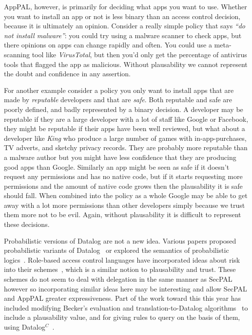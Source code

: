 \documentclass[thesis.tex]{subfiles}
\begin{document}
AppPAL, however, is primarily for deciding what apps you want to use.
Whether you want to install an app or not is less binary than an
access control decision, because it is ultimately an opinion.
Consider a really simple policy that says \emph{``do not install
malware''}: you could try using a malware scanner to check apps, but
there opinions on apps can change rapidly and often.  You could use a
meta-scanning tool like \emph{VirusTotal}, but then you'd only get the
percentage of antivirus tools that flagged the app as malicious.
Without plausability we cannot represent the doubt and confidence in
any assertion.

For another example consider a policy you only want to install apps
that are made by \emph{reputable} developers and that are \emph{safe}.
Both reputable and safe are poorly defined, and badly represented by a
binary decision.  A developer may be reputable if they are a large
developer with a lot of staff like Google or Facebook, they might be
reputable if their apps have been well reviewed, but what about a
developer like \emph{King} who produce a large number of games with
in-app-purchases, TV adverts, and sketchy privacy records.  They are
probably more reputable than a malware author but you might have less
confidence that they are producing good apps than Google.  Similarly
an app might be seen as safe if it doesn't request any permissions and
has no native code, but if it starts requesting more permissions and
the amount of native code grows then the plausability it is safe
should fall.  When combined into the policy as a whole Google may be
able to get away with a lot more permissions than other developers
simply because we trust them more not to be evil.  Again, without
plausability it is difficult to represent these decisions.

Probabilistic versions of Datalog are not a new idea.  Various papers proposed
probabilistic variants of Datalog~\cite{fuhr_probabilistic_1995} or explored the
semantics of probabilistic logics~\cite{halpern_analysis_1990}.  Role-based
access control languages have incorporated ideas about risk into their
schemes~\cite{josang_analysing_2004,dimmock_using_2004,salim_approach_2011},
which is a similar notion to plausability and trust.  These schemes do not seem
to deal with delegation in the same manner as SecPAL however so incorporating
similar ideas here may be interesting and allow SecPAL and AppPAL greater
expressiveness.  Part of the work toward this this year has included modifying Becker's
evaluation and translation-to-Datalog algorithms~\cite{becker_secpal:_2010} to
include a plausability value, and for giving rules to query on the basis of
them, using Datalog$^C$~\cite{li_datalog_2003}.
\end{document}
